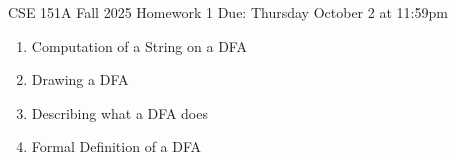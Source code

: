 \documentclass[10pt,letterpaper,unboxed,cm]{article}
\begin{document}
\hfill{CSE 151A Fall 2025}
\hfill{Homework 1}
\hfill{Due: Thursday October 2 at 11:59pm}

\begin{enumerate}
\item Computation of a String on a DFA \newline 
\item Drawing a DFA \newline 
\item Describing what a DFA does \newline 
\item Formal Definition of a DFA \newline



\end{enumerate}
\end{document}
